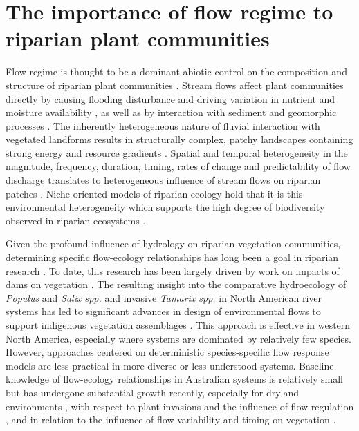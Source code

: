 \section{The importance of flow regime to riparian plant communities}
Flow regime is thought to be a dominant abiotic control on the composition and structure of riparian plant communities \citep{Poff1997}. Stream flows affect plant communities directly by causing flooding disturbance and driving variation in nutrient and moisture availability \citep{Naiman1997}, as well as by interaction with sediment and geomorphic processes \citep{Corenblit2007}. The inherently heterogeneous nature of fluvial interaction with vegetated landforms results in structurally complex, patchy landscapes containing strong energy and resource gradients \citep{Naiman2005}. Spatial and temporal heterogeneity in the magnitude, frequency, duration, timing, rates of change and predictability of flow discharge \citep{Poff1997, Kennard2010} translates to heterogeneous influence of stream flows on riparian patches \citep{Poff1997, Naiman2008}. Niche-oriented models of riparian ecology  hold that it is this environmental heterogeneity which supports the high degree of biodiversity observed in riparian ecosystems \citep{Palmer1997, Bornette2008}.

Given the profound influence of hydrology on riparian vegetation communities, determining specific flow-ecology relationships has long been a goal in riparian research \citep{Auble1994, Lytle2004}. To date, this research has been largely driven by work on impacts of dams on vegetation \citep{Goodwid1997, Nilsson2002}. The resulting insight into the comparative hydroecology of \textit{Populus} and \textit{Salix spp.} and invasive \textit{Tamarix spp.} in North American river systems \citep{Mahoney1998, Shafroth2002} has led to significant advances in design of environmental flows to support indigenous vegetation assemblages \citep{Shafroth2010}. This approach is effective in western North America, especially where systems are dominated by relatively few species. However, approaches centered on deterministic species-specific flow response models are less practical in more diverse or less understood systems. Baseline knowledge of flow-ecology relationships in Australian systems is relatively small but has undergone substantial growth recently, especially for dryland environments \citep{Capon2003, Capon2005, Capon2006, Capon2007}, with respect to plant invasions and the influence of flow regulation \citep{Catford2010, Catford2011, Catford2012, Catford2014, Greet2011, Stokes2008, Maheshwari1995, Siebentritt2004, Arthington2012}, and in relation to the influence of flow variability and timing on vegetation \citep{Greet2011a, Greet2012a, Jardine2015}.

